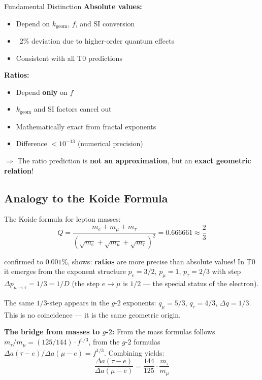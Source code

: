 	\begin{important}{Fundamental Distinction}
		\textbf{Absolute values:}
		\begin{itemize}
			\item Depend on $k_{\text{geom}}$, $f$, and SI conversion
			\item ~2\% deviation due to higher-order quantum effects
			\item Consistent with all T0 predictions
		\end{itemize}
		
		\textbf{Ratios:}
		\begin{itemize}
			\item Depend \textbf{only} on $f$
			\item $k_{\text{geom}}$ and SI factors cancel out
			\item Mathematically exact from fractal exponents
			\item Difference $< 10^{-13}$ (numerical precision)
		\end{itemize}
		
		$\Rightarrow$ The ratio prediction is \textbf{not an approximation}, but an \textbf{exact geometric relation}!
	\end{important}
	
	\subsection{Analogy to the Koide Formula}
	
	The Koide formula for lepton masses:
	\begin{equation}
		Q = \frac{m_e + m_\mu + m_\tau}{(\sqrt{m_e} + \sqrt{m_\mu} + \sqrt{m_\tau})^2} = 0.666661 \approx \frac{2}{3}
	\end{equation}
	
	confirmed to $0.001\%$, shows: \textbf{ratios} are more precise than absolute values! In T0 it emerges from the exponent structure $p_e = 3/2$, $p_\mu = 1$, $p_\tau = 2/3$ with step $\Delta p_{\mu\to\tau} = 1/3 = 1/D$ (the step $e\to\mu$ is $1/2$ --- the special status of the electron).
	
	The same $1/3$-step appears in the $g$-$2$ exponents: $q_\mu = 5/3$, $q_\tau = 4/3$, $\Delta q = 1/3$. This is no coincidence --- it is the same geometric origin.
	
	\textbf{The bridge from masses to $g$-$2$:} From the mass formulas follows $m_\tau/m_\mu = (125/144) \cdot f^{1/3}$, from the $g$-$2$ formulas $\Delta a(\tau{-}e)/\Delta a(\mu{-}e) = f^{1/3}$. Combining yields:
	\begin{equation}
		\boxed{\frac{\Delta a(\tau{-}e)}{\Delta a(\mu{-}e)} = \frac{144}{125} \cdot \frac{m_\tau}{m_\mu}}
		\label{eq:bridge}
	\end{equation}
	
